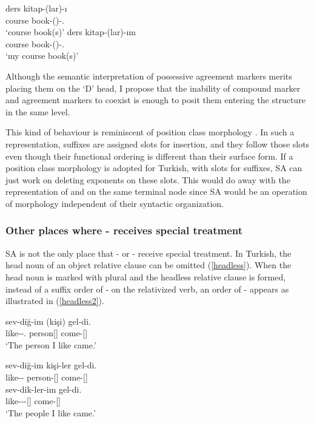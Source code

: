 \begin{exe}
    \ex \label{plural}
    \begin{xlist}
        \ex \gll ders kitap-(lar)-ı \\ course book-({\Pl})-{\Poss.\Tsg} \\
        \glt `course book(s)'
        \ex \gll ders kitap-(lar)-ım \\ course book-({\Pl})-{\Poss.\Fsg} \\
        \glt `my course book(s)'
    \end{xlist}
\end{exe}

Although the semantic interpretation of possessive agreement markers merits placing them on the `D' head, I propose that the inability of compound marker and agreement markers to coexist is enough to posit them entering the structure in the same level.

This kind of behaviour is reminiscent of position class morphology \citep{inkelas1993nimboran,stump1993position}. In such a representation, suffixes are assigned slots for insertion, and they follow those slots even though their functional ordering is different than their surface form. If a position class morphology is adopted for Turkish, with slots for suffixes, SA can just work on deleting exponents on these slots. This would do away with the representation of {\Pl} and {\Poss} on the same terminal node since SA would be an operation of morphology independent of their syntactic organization.


\subsubsection{Other places where {\Pl-\Poss} receives special treatment}

SA is not the only place that {\Pl-\Poss} or {\Pl-\Agr} receive special treatment. In Turkish, the head noun of an object relative clause can be omitted (\ref{headless}). When the head noun is marked with plural and the headless relative clause is formed, instead of a suffix order of {\Poss-\Pl} on the relativized verb, an order of {\Pl-\Poss} appears as illustrated in (\ref{headless2}).

\begin{exe}
    \ex \label{headless}
    \gll sev-diğ-im (kişi) gel-di. \\ 
    like-{\Pp}-{\Poss.\Fsg} person[{\Nom}] come-{\Pst}[{\Tsg}] \\
    \glt `The person I like came.'
    
    \ex \label{headless2}
    \begin{xlist}
    \ex \gll sev-diğ-im kişi-ler gel-di. \\ 
    like-{\Pp}-{\Fsg} person-{\Pl}[{\Nom}] come-{\Pst}[{\Tsg}] \\
    
    \ex \gll sev-dik-ler-im gel-di. \\ 
    like-{\Pp}-{\Pl}-{\Fsg}[{\Nom}] come-{\Pst}[{\Tpl}] \\
    \glt `The people I like came.'
    \end{xlist}
\end{exe}

